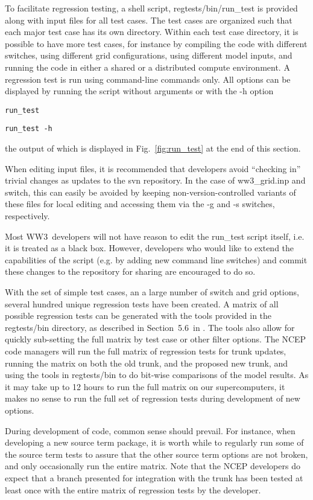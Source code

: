 \documentclass[12pt]{article}
\newcommand{\manref}{ww3man2016}
\newcommand{\manregtestsec}{5.6}
\newcommand{\ws}{WW3}
\newcommand{\file}{\sf}
\newcommand{\code}{\tt}
\newcommand{\command}[1]{\begin{center}{\code #1}\end{center}}
\begin{document}
To facilitate regression testing, a shell script, {\file
  regtests/bin/run\_test} is provided along with input files for all test
cases. The test cases are organized such that each major test case has its own
directory. Within each test case directory, it is possible to have more test
cases, for instance by compiling the code with different switches, using
different grid configurations, using different model inputs, and running the
code in either a shared or a distributed compute environment. A regression
test is run using command-line commands only. All options can be displayed by
running the script without arguments or with the {\file -h} option
\command{run\_test} \command{run\_test -h} the output of which is displayed in
Fig.~\ref{fig:run_test} at the end of this section.

When editing input files, it is recommended that developers avoid ``checking
in'' trivial changes as updates to the svn repository. In the case of {\file
  ww3\_grid.inp} and {\file switch}, this can easily be avoided by keeping
non-version-controlled variants of these files for local editing and accessing
them via the -g and -s switches, respectively.

Most \ws\ developers will not have reason to edit the {\file run\_test} script
itself, i.e. it is treated as a black box. However, developers who would like
to extend the capabilities of the script (e.g. by adding new command line
switches) and commit these changes to the repository for sharing are
encouraged to do so.

\vspace{\baselineskip} \noindent With the set of simple test cases, an a large
number of switch and grid options, several hundred unique regression tests
have been created. A matrix of all possible regression tests can be generated
with the tools provided in the {\file regtests/bin} directory, as described in
Section~\manregtestsec\ in \cite{\manref}. The tools also allow for quickly
sub-setting the full matrix by test case or other filter options. The NCEP
code managers will run the full matrix of regression tests for trunk updates,
running the matrix on both the old trunk, and the proposed new trunk, and
using the tools in {\file regtests/bin} to do bit-wise comparisons of the
model results. As it may take up to 12 hours to run the full matrix on our
supercomputers, it makes no sense to run the full set of regression tests
during development of new options.

During development of code, common sense should prevail. For instance, when
developing a new source term package, it is worth while to regularly run some
of the source term tests to assure that the other source term options are not
broken, and only occasionally run the entire matrix. Note that the NCEP
developers do expect that a branch presented for integration with the trunk
has been tested at least once with the entire matrix of regression tests by
the developer.
\end{document}
